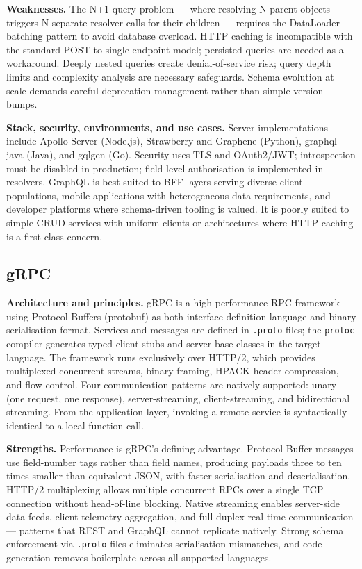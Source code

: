 \documentclass[11pt,a4paper]{article}
\begin{document}
\textbf{Weaknesses.}
The N+1 query problem --- where resolving N parent objects triggers N separate resolver
calls for their children --- requires the DataLoader batching pattern to avoid database
overload. HTTP caching is incompatible with the standard POST-to-single-endpoint model;
persisted queries are needed as a workaround. Deeply nested queries create
denial-of-service risk; query depth limits and complexity analysis are necessary
safeguards. Schema evolution at scale demands careful deprecation management rather than
simple version bumps.

\textbf{Stack, security, environments, and use cases.}
Server implementations include Apollo Server (Node.js), Strawberry and Graphene (Python),
graphql-java (Java), and gqlgen (Go). Security uses TLS and OAuth2/JWT; introspection
must be disabled in production; field-level authorisation is implemented in resolvers.
GraphQL is best suited to BFF layers serving diverse client populations, mobile
applications with heterogeneous data requirements, and developer platforms where
schema-driven tooling is valued. It is poorly suited to simple CRUD services with uniform
clients or architectures where HTTP caching is a first-class concern.

\subsection{gRPC}

\textbf{Architecture and principles.}
gRPC is a high-performance RPC framework using Protocol Buffers (protobuf) as both
interface definition language and binary serialisation format. Services and messages are
defined in \texttt{.proto} files; the \texttt{protoc} compiler generates typed client
stubs and server base classes in the target language. The framework runs exclusively over
HTTP/2, which provides multiplexed concurrent streams, binary framing, HPACK header
compression, and flow control. Four communication patterns are natively supported:
unary (one request, one response), server-streaming, client-streaming, and bidirectional
streaming. From the application layer, invoking a remote service is syntactically
identical to a local function call.

\textbf{Strengths.}
Performance is gRPC's defining advantage. Protocol Buffer messages use field-number tags
rather than field names, producing payloads three to ten times smaller than equivalent JSON,
with faster serialisation and deserialisation. HTTP/2 multiplexing allows multiple
concurrent RPCs over a single TCP connection without head-of-line blocking. Native
streaming enables server-side data feeds, client telemetry aggregation, and full-duplex
real-time communication --- patterns that REST and GraphQL cannot replicate natively.
Strong schema enforcement via \texttt{.proto} files eliminates serialisation mismatches,
and code generation removes boilerplate across all supported languages.
\end{document}
